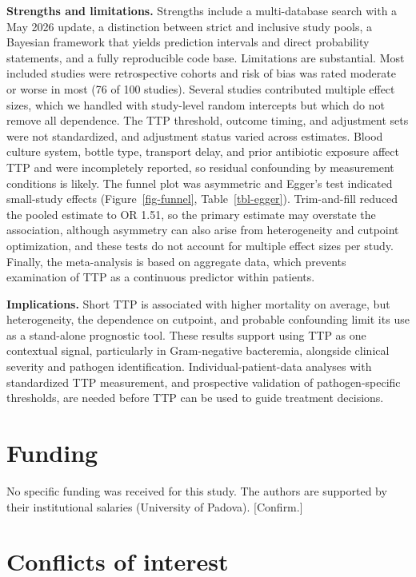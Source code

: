 \documentclass[
  11pt,
]{article}
\begin{document}
\textbf{Strengths and limitations.} Strengths include a multi-database
search with a May 2026 update, a distinction between strict and
inclusive study pools, a Bayesian framework that yields prediction
intervals and direct probability statements, and a fully reproducible
code base. Limitations are substantial. Most included studies were
retrospective cohorts and risk of bias was rated moderate or worse in
most (76 of 100 studies). Several studies contributed multiple effect
sizes, which we handled with study-level random intercepts but which do
not remove all dependence. The TTP threshold, outcome timing, and
adjustment sets were not standardized, and adjustment status varied
across estimates. Blood culture system, bottle type, transport delay,
and prior antibiotic exposure affect TTP and were incompletely reported,
so residual confounding by measurement conditions is likely. The funnel
plot was asymmetric and Egger's test indicated small-study effects
(Figure~\ref{fig-funnel}, Table~\ref{tbl-egger}). Trim-and-fill reduced
the pooled estimate to OR 1.51, so the primary estimate may overstate
the association, although asymmetry can also arise from heterogeneity
and cutpoint optimization, and these tests do not account for multiple
effect sizes per study. Finally, the meta-analysis is based on aggregate
data, which prevents examination of TTP as a continuous predictor within
patients.

\textbf{Implications.} Short TTP is associated with higher mortality on
average, but heterogeneity, the dependence on cutpoint, and probable
confounding limit its use as a stand-alone prognostic tool. These
results support using TTP as one contextual signal, particularly in
Gram-negative bacteremia, alongside clinical severity and pathogen
identification. Individual-patient-data analyses with standardized TTP
measurement, and prospective validation of pathogen-specific thresholds,
are needed before TTP can be used to guide treatment decisions.

\section*{Funding}\label{funding}

No specific funding was received for this study. The authors are
supported by their institutional salaries (University of Padova).
{[}Confirm.{]}

\section*{Conflicts of interest}\label{conflicts-of-interest}
\end{document}
